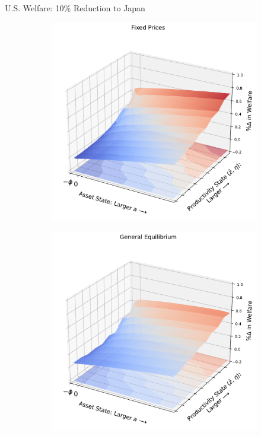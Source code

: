 \documentclass[9pt,pdftex,aspectratio=1610]{beamer}
\theoremstyle{definition}
\begin{document}
\begin{frame}[t]{U.S. Welfare: 10\% Reduction to Japan }
\begin{figure}[!t]
\begin{subfigure}{}
    \includegraphics[scale = 0.35]{../notes/figures/welfare-jpn-fix-p.pdf}
\end{subfigure}
\begin{subfigure}{}
    \includegraphics[scale = 0.35]{../notes/figures/welfare-jpn-ge.pdf}
\end{subfigure}
\end{figure}
\bigskip
\end{frame}
\end{document}
